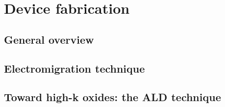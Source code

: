\chapter{Device fabrication}

\section{General overview}
\section{Electromigration technique}
\section{Toward high-k oxides: the ALD technique}

